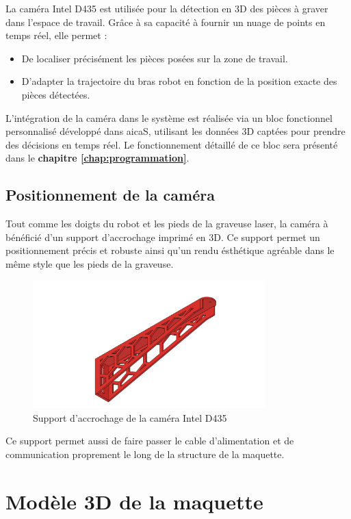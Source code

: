 La caméra Intel D435 \cite{IntelD435} est utilisée pour la détection en 3D des pièces à graver dans l’espace de travail. Grâce à sa capacité à fournir un nuage de points en temps réel, elle permet :
\begin{itemize}
    \item De localiser précisément les pièces posées sur la zone de travail.
    \item D’adapter la trajectoire du bras robot en fonction de la position exacte des pièces détectées.
\end{itemize}

L’intégration de la caméra dans le système est réalisée via un bloc fonctionnel personnalisé développé dans \gls{aicaS}, utilisant les données 3D captées pour prendre des décisions en temps réel. Le fonctionnement détaillé de ce bloc sera présenté dans le \textbf{chapitre \ref{chap:programmation}}.

\subsection{Positionnement de la caméra}

Tout comme les doigts du robot et les pieds de la graveuse laser, la caméra à bénéficié d'un support d'accrochage imprimé en 3D. Ce support permet un positionnement précis et robuste ainsi qu'un rendu ésthétique agréable dans le même style que les pieds de la graveuse.

\begin{figure}[H]
    \centering
    \includegraphics[width=0.8\textwidth]{assets/figures/Porte_camera v6.png}
    \caption{Support d'accrochage de la caméra Intel D435}
    \label{fig:support_camera}
\end{figure}

Ce support permet aussi de faire passer le cable d'alimentation et de communication proprement le long de la structure de la maquette.


\section{Modèle 3D de la maquette}

